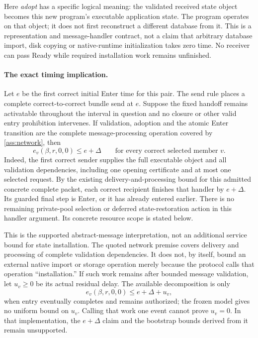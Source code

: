 Here \emph{adopt} has a specific logical meaning: the validated received
state object becomes this new program's executable application state.
The program operates on that object; it does not first reconstruct a
different database from it. This is a representation and message-handler
contract, not a claim that arbitrary database import, disk copying or
native-runtime initialization takes zero time. No receiver can pass Ready
while required installation work remains unfinished.

\paragraph{The exact timing implication.}
Let $e$ be the first correct initial Enter time for this pair. The send
rule places a complete correct-to-correct bundle send at $e$. Suppose the
fixed handoff remains activatable throughout the interval in question
and no closure or other valid entry prohibition intervenes.
If validation, adoption and the atomic Enter transition are the complete
message-processing operation covered by \cref{ass:network}, then
\[
 e_v(\beta,r,0,0)\le e+\Delta
 \qquad\text{for every correct selected member }v.
\]
Indeed, the first correct sender supplies the full executable object and
all validation dependencies, including one opening certificate and at
most one selected request. By the existing delivery-and-processing bound
for this admitted concrete complete packet, each correct recipient
finishes that handler by $e+\Delta$.
Its guarded final step is Enter, or it has already entered earlier.
There is no remaining private-pool selection or deferred state-restoration
action in this handler argument. Its concrete resource scope is stated
below.

This is the supported abstract-message interpretation, not an additional
service bound for state installation. The quoted network premise covers
delivery and processing of complete validation dependencies. It does not,
by itself, bound an external native import or storage operation merely
because the protocol calls that operation ``installation.'' If such work
remains after bounded message validation, let $u_v\ge0$ be its actual
residual delay. The available decomposition is only
\[
 e_v(\beta,r,0,0)\le e+\Delta+u_v,
\]
when entry eventually completes and remains authorized; the frozen model
gives no uniform bound on $u_v$. Calling that work one event cannot prove
$u_v=0$. In that implementation, the $e+\Delta$ claim and the bootstrap
bounds derived from it remain unsupported.


